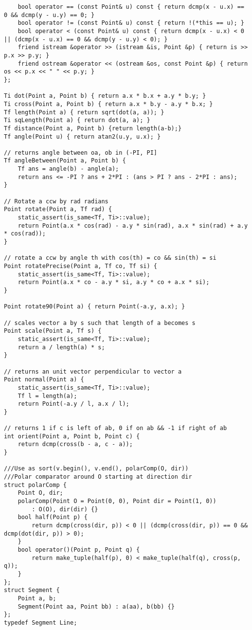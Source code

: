 \documentclass[FSZ,a4paper,onesided]{article}
\begin{document}
\begin{multicols*}{\COLS}
\begin{lstlisting}
    bool operator == (const Point& u) const { return dcmp(x - u.x) == 0 && dcmp(y - u.y) == 0; }
    bool operator != (const Point& u) const { return !(*this == u); }
    bool operator < (const Point& u) const { return dcmp(x - u.x) < 0 || (dcmp(x - u.x) == 0 && dcmp(y - u.y) < 0); }
    friend istream &operator >> (istream &is, Point &p) { return is >> p.x >> p.y; }
    friend ostream &operator << (ostream &os, const Point &p) { return os << p.x << " " << p.y; }
};
 
Ti dot(Point a, Point b) { return a.x * b.x + a.y * b.y; }
Ti cross(Point a, Point b) { return a.x * b.y - a.y * b.x; }
Tf length(Point a) { return sqrt(dot(a, a)); }
Ti sqLength(Point a) { return dot(a, a); }
Tf distance(Point a, Point b) {return length(a-b);}
Tf angle(Point u) { return atan2(u.y, u.x); }
 
// returns angle between oa, ob in (-PI, PI]
Tf angleBetween(Point a, Point b) {
    Tf ans = angle(b) - angle(a);
    return ans <= -PI ? ans + 2*PI : (ans > PI ? ans - 2*PI : ans);
}
 
// Rotate a ccw by rad radians
Point rotate(Point a, Tf rad) {
    static_assert(is_same<Tf, Ti>::value);
    return Point(a.x * cos(rad) - a.y * sin(rad), a.x * sin(rad) + a.y * cos(rad));
}
 
// rotate a ccw by angle th with cos(th) = co && sin(th) = si
Point rotatePrecise(Point a, Tf co, Tf si) {
    static_assert(is_same<Tf, Ti>::value);
    return Point(a.x * co - a.y * si, a.y * co + a.x * si);
}
 
Point rotate90(Point a) { return Point(-a.y, a.x); }
 
// scales vector a by s such that length of a becomes s
Point scale(Point a, Tf s) {
    static_assert(is_same<Tf, Ti>::value);
    return a / length(a) * s;
}
 
// returns an unit vector perpendicular to vector a
Point normal(Point a) {
    static_assert(is_same<Tf, Ti>::value);
    Tf l = length(a);
    return Point(-a.y / l, a.x / l);
}
 
// returns 1 if c is left of ab, 0 if on ab && -1 if right of ab
int orient(Point a, Point b, Point c) {
    return dcmp(cross(b - a, c - a));
}
 
///Use as sort(v.begin(), v.end(), polarComp(O, dir))
///Polar comparator around O starting at direction dir
struct polarComp {
    Point O, dir;
    polarComp(Point O = Point(0, 0), Point dir = Point(1, 0))
        : O(O), dir(dir) {}
    bool half(Point p) {
        return dcmp(cross(dir, p)) < 0 || (dcmp(cross(dir, p)) == 0 && dcmp(dot(dir, p)) > 0);
    }
    bool operator()(Point p, Point q) {
        return make_tuple(half(p), 0) < make_tuple(half(q), cross(p, q));
    }
};
struct Segment {
    Point a, b;
    Segment(Point aa, Point bb) : a(aa), b(bb) {}
};
typedef Segment Line;
 

\end{lstlisting}
\end{multicols*}
\end{document}
